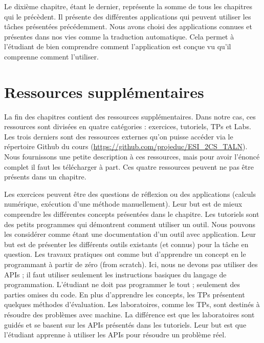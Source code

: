 \documentclass{KodeBook}
\begin{document}
Le dixième chapitre, étant le dernier, représente la somme de tous les chapitres qui le précèdent.
Il présente des différentes applications qui peuvent utiliser les tâches présentées précédemment.
Nous avons choisi des applications connues et présentes dans nos vies comme la traduction automatique.
Cela permet à l'étudiant de bien comprendre comment l'application est conçue vu qu'il comprenne comment l'utiliser.


\section*{Ressources supplémentaires}

La fin des chapitres contient des ressources supplémentaires.
Dans notre cas, ces ressources sont divisées en quatre catégories : exercices, tutoriels, TPs et Labs.
Les trois derniers sont des ressources externes qu'on puisse accéder via le répertoire Github du cours (\url{https://github.com/projeduc/ESI_2CS_TALN}).
Nous fournissons une petite description à ces ressources, mais pour avoir l'énoncé complet il faut les télécharger à part.
Ces quatre ressources peuvent ne pas être présents dans un chapitre.

Les exercices peuvent être des questions de réflexion ou des applications (calculs numérique, exécution d'une méthode manuellement).
Leur but est de mieux comprendre les différentes concepts présentées dans le chapitre.
Les tutoriels sont des petits programmes qui démontrent comment utiliser un outil.
Nous pouvons les considérer comme étant une documentation d'un outil avec application.
Leur but est de présenter les différents outils existants (et connus) pour la tâche en question.
Les travaux pratiques ont comme but d'apprendre un concept en le programmant à partir de zéro (from scratch).
Ici, nous ne devons pas utiliser des APIs ; il faut utiliser seulement les instructions basiques du langage de programmation.
L'étudiant ne doit pas programmer le tout ; seulement des parties omises du code.
En plus d'apprendre les concepts, les TPs présentent quelques méthodes d'évaluation.
Les laboratoires, comme les TPs, sont destinés à résoudre des problèmes avec machine.
La différence est que les laboratoires sont guidés et se basent sur les APIs présentés dans les tutoriels.
Leur but est que l'étudiant apprenne à utiliser les APIs pour résoudre un problème réel.


\ifx\wholebook\relax\else
% 
% 
	
\end{document}
